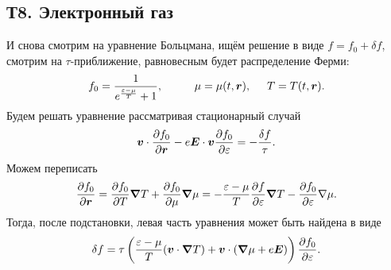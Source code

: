 \subsection*{Т8. Электронный газ}


И снова смотрим на уравнение Больцмана, ищём решение в виде $f = f_0 + \delta f$, смотрим на $\tau$-приближение, равновесным будет распределение Ферми:
\begin{equation*}
	f_0 = \frac{1}{e^{\frac{\varepsilon-\mu}{T}} + 1},
	\hspace{10 mm} 
	\mu = \mu (t, \vc{r}),
	\hspace{5 mm} 
	T = T(t, \vc{r}).
\end{equation*}
Будем решать уравнение рассматривая стационарный случай
\begin{equation*}
	\boldsymbol{v} \cdot \frac{\partial f_0}{\partial \boldsymbol{r}} - e \boldsymbol{E} \cdot \boldsymbol{v} \frac{\partial f_0}{\partial \varepsilon}  = - \frac{\delta f}{\tau}.
\end{equation*}
Можем переписать 
\begin{equation*}
	\frac{\partial f_0}{\partial \boldsymbol{r}} = \frac{\partial f_0}{\partial T}  \boldsymbol{\nabla} T + \frac{\partial f_0}{\partial \mu} \boldsymbol{\nabla} \mu = - \frac{\varepsilon-\mu}{T} \frac{\partial f}{\partial \varepsilon} \boldsymbol{\nabla} T - \frac{\partial f_0}{\partial \varepsilon} \nabla \mu.
\end{equation*}
Тогда, после подстановки, левая часть уравнения может быть найдена в виде
\begin{equation*}
	\delta f = \tau \left(
		\frac{\varepsilon-\mu}{T} (\boldsymbol{v} \cdot \boldsymbol{\nabla} T) + \boldsymbol{v} \cdot (\boldsymbol{\nabla} \mu + e \boldsymbol{E})
	\right) \frac{\partial f_0}{\partial \varepsilon} .
\end{equation*}


